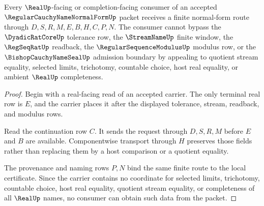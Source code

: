 \begin{theorem}
\label{thm:regular-cauchy-name-normal-form-route-nonescape}
Every $\RealUp$-facing or completion-facing consumer of an accepted $\RegularCauchyNameNormalFormUp$ packet receives a finite normal-form route through $D,S,R,M,E,B,H,C,P,N$. The consumer cannot bypass the $\DyadicRatCoreUp$ tolerance row, the $\StreamNameUp$ finite window, the $\RegSeqRatUp$ readback, the $\RegularSequenceModulusUp$ modulus row, or the $\BishopCauchyNameSealUp$ admission boundary by appealing to quotient stream equality, selected limits, trichotomy, countable choice, host real equality, or ambient $\RealUp$ completeness.
\end{theorem}
\begin{proof}
Begin with a real-facing read of an accepted carrier. The only terminal real row is $E$, and the carrier places it after the displayed tolerance, stream, readback, and modulus rows.

Read the continuation row $C$. It sends the request through $D,S,R,M$ before $E$ and $B$ are available. Componentwise transport through $H$ preserves those fields rather than replacing them by a host comparison or a quotient equality.

The provenance and naming rows $P,N$ bind the same finite route to the local certificate. Since the carrier contains no coordinate for selected limits, trichotomy, countable choice, host real equality, quotient stream equality, or completeness of all $\RealUp$ names, no consumer can obtain such data from the packet.
\end{proof}


\begin{closurestatus}{\RegularCauchyNameNormalFormUp}
  \theoryclosure{\seedClosure}
  \formalstatus{\unformalizedV}
\end{closurestatus}
